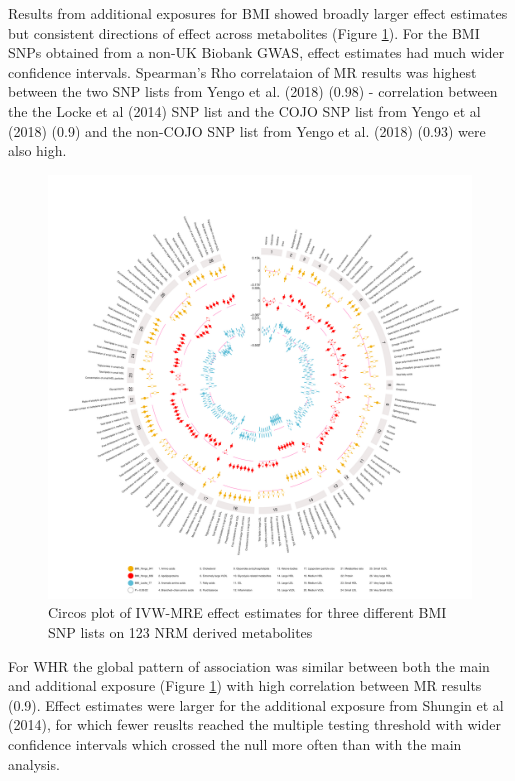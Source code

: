 \documentclass[11pt,twoside]{bristolthesis}
\begin{document}
Results from additional exposures for BMI showed broadly larger effect estimates but consistent directions of effect across metabolites (Figure \ref{fig:chapter5-figure-circosplot-additional-BMI}). For the BMI SNPs obtained from a non-UK Biobank GWAS, effect estimates had much wider confidence intervals. Spearman's Rho correlataion of MR results was highest between the two SNP lists from Yengo et al. (2018) (0.98) - correlation between the the Locke et al (2014) SNP list and the COJO SNP list from Yengo et al (2018) (0.9) and the non-COJO SNP list from Yengo et al. (2018) (0.93) were also high.
\begin{figure}
\includegraphics[width=1\linewidth]{data/chapter5/figures/circosplot_additional_BMI} \caption{Circos plot of IVW-MRE effect estimates for three different BMI SNP lists on 123 NRM derived metabolites}\label{fig:chapter5-figure-circosplot-additional-BMI}
\end{figure}
For WHR the global pattern of association was similar between both the main and additional exposure (Figure \ref{fig:chapter5-figure-circosplot-additional-BMI}) with high correlation between MR results (0.9). Effect estimates were larger for the additional exposure from Shungin et al (2014), for which fewer reuslts reached the multiple testing threshold with wider confidence intervals which crossed the null more often than with the main analysis.
\end{document}
